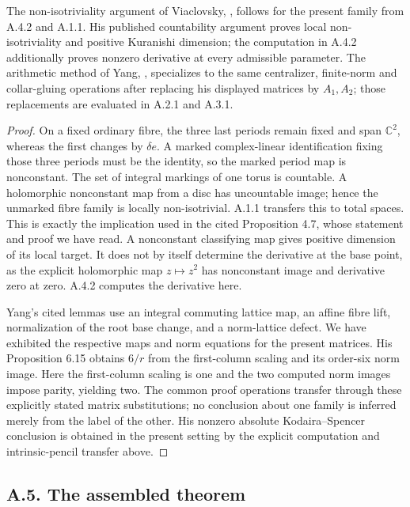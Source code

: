 \begin{proposition}[A.4.3; Proved]\label{st:A.4.3}
The non-isotriviality argument of Viaclovsky, \cite[Proposition 4.7]{VL26}, follows for the present family from A.4.2 and A.1.1. His published countability argument proves local non-isotriviality and positive Kuranishi dimension; the computation in A.4.2 additionally proves nonzero derivative at every admissible parameter. The arithmetic method of Yang, \cite[Lemmas 6.6--6.9 and Proposition 6.15]{Y26}, specializes to the same centralizer, finite-norm and collar-gluing operations after replacing his displayed matrices by $A_1,A_2$; those replacements are evaluated in A.2.1 and A.3.1.
\end{proposition}
\begin{proof}
On a fixed ordinary fibre, the three last periods remain fixed and span $\mathbb C^2$, whereas the first changes by $\delta e$. A marked complex-linear identification fixing those three periods must be the identity, so the marked period map is nonconstant. The set of integral markings of one torus is countable. A holomorphic nonconstant map from a disc has uncountable image; hence the unmarked fibre family is locally non-isotrivial. A.1.1 transfers this to total spaces. This is exactly the implication used in the cited Proposition 4.7, whose statement and proof we have read. A nonconstant classifying map gives positive dimension of its local target. It does not by itself determine the derivative at the base point, as the explicit holomorphic map $z\mapsto z^2$ has nonconstant image and derivative zero at zero. A.4.2 computes the derivative here.

Yang's cited lemmas use an integral commuting lattice map, an affine fibre lift, normalization of the root base change, and a norm-lattice defect. We have exhibited the respective maps and norm equations for the present matrices. His Proposition 6.15 obtains $6/r$ from the first-column scaling and its order-six norm image. Here the first-column scaling is one and the two computed norm images impose parity, yielding two. The common proof operations transfer through these explicitly stated matrix substitutions; no conclusion about one family is inferred merely from the label of the other. His nonzero absolute Kodaira--Spencer conclusion is obtained in the present setting by the explicit computation and intrinsic-pencil transfer above.
\end{proof}

\subsection{A.5. The assembled theorem}

